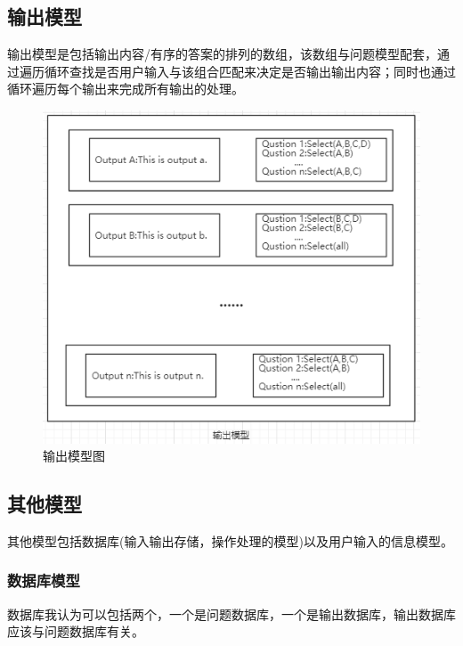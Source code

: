 \documentclass[UTF8,18pt]{ctexart}
\begin{document}
{\subsection{输出模型}
输出模型是包括输出内容/有序的答案的排列的数组，该数组与问题模型配套，通过遍历循环查找是否用户输入与该组合匹配来决定是否输出输出内容；同时也通过循环遍历每个输出来完成所有输出的处理。
\begin{figure}[H]
	\centering
	\includegraphics[scale=0.6]{scmx.png}
	\caption{输出模型图}
	\label{fig:输出模型}
\end{figure}
\subsection{其他模型}
其他模型包括数据库(输入输出存储，操作处理的模型)以及用户输入的信息模型。
\subsubsection{数据库模型}
数据库我认为可以包括两个，一个是问题数据库，一个是输出数据库，输出数据库应该与问题数据库有关。

}
\end{document}
